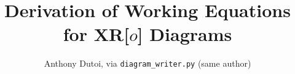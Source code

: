 \documentclass[12pt,letterpaper]{article}
\begin{document}



\title{Derivation of Working Equations for XR[$o$] Diagrams}
\author{Anthony Dutoi, via \texttt{diagram\_writer.py} (same author)}
\maketitle


\begin{spacing}{0.75}


\end{spacing}
\end{document}
